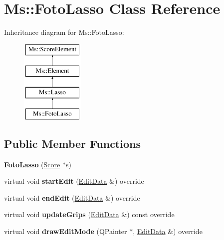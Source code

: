 \hypertarget{class_ms_1_1_foto_lasso}{}\section{Ms\+:\+:Foto\+Lasso Class Reference}
\label{class_ms_1_1_foto_lasso}
Inheritance diagram for Ms\+:\+:Foto\+Lasso\+:\begin{figure}[H]
\begin{center}
\leavevmode
\includegraphics[height=4.000000cm]{class_ms_1_1_foto_lasso}
\end{center}
\end{figure}
\subsection*{Public Member Functions}
\begin{DoxyCompactItemize}
\item 
\mbox{\label{class_ms_1_1_foto_lasso_af12e18941c47bea1124a381a52e98be2}} 
{\bfseries Foto\+Lasso} (\hyperlink{class_ms_1_1_score}{Score} $\ast$s)
\item 
\mbox{\label{class_ms_1_1_foto_lasso_a41a571f0f839145d63ce9017db63f73b}} 
virtual void {\bfseries start\+Edit} (\hyperlink{class_ms_1_1_edit_data}{Edit\+Data} \&) override
\item 
\mbox{\label{class_ms_1_1_foto_lasso_a551e94e263fd86c7563110c2d37b6c35}} 
virtual void {\bfseries end\+Edit} (\hyperlink{class_ms_1_1_edit_data}{Edit\+Data} \&) override
\item 
\mbox{\label{class_ms_1_1_foto_lasso_a1cd1d078c1ee659ee0a40f89bfe75d2a}} 
virtual void {\bfseries update\+Grips} (\hyperlink{class_ms_1_1_edit_data}{Edit\+Data} \&) const override
\item 
\mbox{\label{class_ms_1_1_foto_lasso_ad455dbaab347b53e10d968f85bcfcf8b}} 
virtual void {\bfseries draw\+Edit\+Mode} (Q\+Painter $\ast$, \hyperlink{class_ms_1_1_edit_data}{Edit\+Data} \&) override
\end{DoxyCompactItemize}
